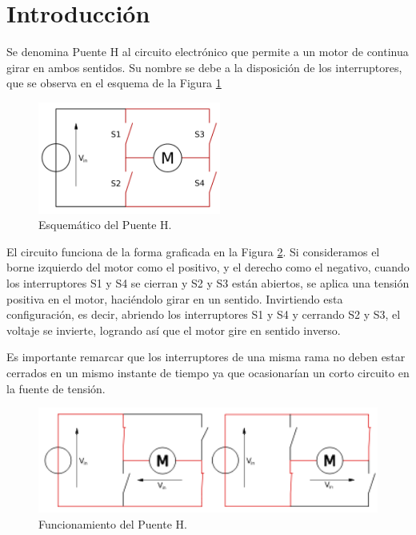 \documentclass[11pt, a4paper]{article}
\begin{document}
	
\tableofcontents
\clearpage

\section{Introducción}

Se denomina Puente H al circuito electrónico que permite a un motor de continua girar en ambos sentidos. Su nombre se debe a la disposición de los interruptores, que se observa en el esquema de la Figura \ref{fig:puenteH}

\begin{figure}[h]
	\centering
	\includegraphics[width=6cm]{Imagenes/puenteH}
	\caption{Esquemático del Puente H.}
	\label{fig:puenteH}
\end{figure} 

El circuito funciona de la forma graficada en la Figura \ref{fig:puenteH_operacion}. Si consideramos el borne izquierdo del motor como el positivo, y el derecho como el negativo, cuando los interruptores S1 y S4 se cierran y S2 y S3 están abiertos, se aplica una tensión positiva en el motor, haciéndolo girar en un sentido. Invirtiendo esta configuración, es decir, abriendo los interruptores S1 y S4 y cerrando S2 y S3, el voltaje se invierte, logrando así que el motor gire en sentido inverso. 

Es importante remarcar que los interruptores de una misma rama no deben estar cerrados en un mismo instante de tiempo ya que ocasionarían un
corto circuito en la fuente de tensión. 

\begin{figure}[h]
	\centering
	\includegraphics[width=13cm]{Imagenes/puenteH_operacion}
	\caption{Funcionamiento del Puente H.}
	\label{fig:puenteH_operacion}
\end{figure} 
\end{document}
